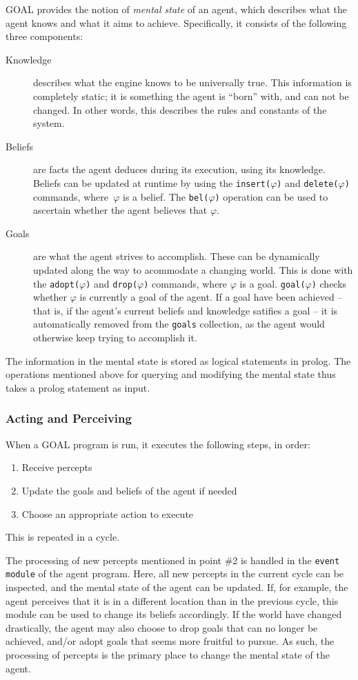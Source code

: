 GOAL provides the notion of \emph{mental state} of an agent, which
describes what the agent knows and what it aims to achieve. Specifically,
it consists of the following three components:
\begin{description}
\item [{Knowledge}] describes what the engine knows to be universally true.
This information is completely static; it is something the agent is
``born'' with, and can not be changed. In other words, this describes
the rules and constants of the system.
\item [{Beliefs}] are facts the agent deduces during its execution, using
its knowledge. Beliefs can be updated at runtime by using the \texttt{insert($\varphi$)}
and \texttt{delete($\varphi$)} commands, where\texttt{ $\varphi$}
is a belief. The \texttt{bel($\varphi$)} operation can be used to
ascertain whether the agent believes that $\varphi$.
\item [{Goals}] are what the agent strives to accomplish. These can be
dynamically updated along the way to acommodate a changing world.
This is done with the \texttt{adopt($\varphi$)} and \texttt{drop($\varphi$)}
commands, where $\varphi$ is a goal. \texttt{goal($\varphi$)} checks
whether $\varphi$ is currently a goal of the agent. If a goal have
been achieved -- that is, if the agent's current beliefs and knowledge
satifies a goal -- it is automatically removed from the \texttt{goals}
collection, as the agent would otherwise keep trying to accomplish
it. 
\end{description}
The information in the mental state is stored as logical statements
in prolog. The operations mentioned above for querying and modifying
the mental state thus takes a prolog statement as input.


\subsubsection*{Acting and Perceiving}

When a GOAL program is run, it executes the following steps, in order:
\begin{enumerate}
\item Receive percepts
\item Update the goals and beliefs of the agent if needed
\item Choose an appropriate action to execute
\end{enumerate}
This is repeated in a cycle. 

The processing of new percepts mentioned in point \#2 is handled in
the \texttt{event module} of the agent program. Here, all new percepts
in the current cycle can be inspected, and the mental state of the
agent can be updated. If, for example, the agent perceives that it
is in a different location than in the previous cycle, this module
can be used to change its beliefs accordingly. If the world have changed
drastically, the agent may also choose to drop goals that can no longer
be achieved, and/or adopt goals that seems more fruitful to pursue.
As such, the processing of percepts is the primary place to change
the mental state of the agent.


